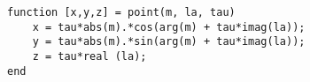 \begin{verbatim}
function [x,y,z] = point(m, la, tau)
    x = tau*abs(m).*cos(arg(m) + tau*imag(la));
    y = tau*abs(m).*sin(arg(m) + tau*imag(la));
    z = tau*real (la);
end
\end{verbatim}